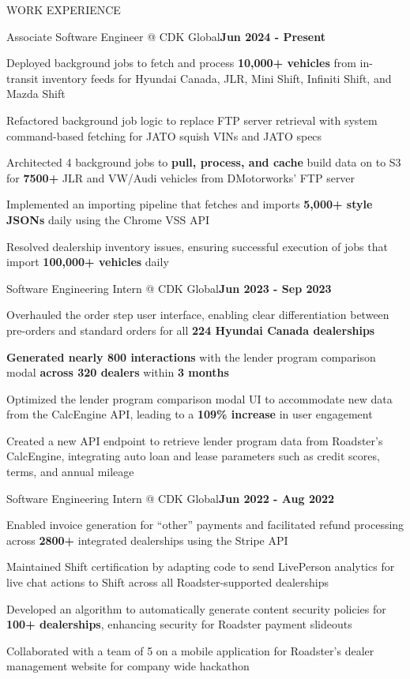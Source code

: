 \documentclass[]{resume}
\begin{document}
\begin{section}{WORK EXPERIENCE}
    \begin{subsection}{Associate Software Engineer @ CDK Global}{}{\textbf{Jun 2024 - Present}}{}
        \item Deployed background jobs to fetch and process \textbf{10,000+ vehicles} from in-transit inventory feeds for Hyundai Canada, JLR, Mini Shift, Infiniti Shift, and Mazda Shift
        \item Refactored background job logic to replace FTP server retrieval with system command-based fetching for JATO squish VINs and JATO specs
        \item Architected 4 background jobs to \textbf{pull, process, and cache} build data on to S3 for \textbf{7500+} JLR and VW/Audi vehicles from DMotorworks' FTP server
        \item Implemented an importing pipeline that fetches and imports \textbf{5,000+ style JSONs} daily using the Chrome VSS API
        \item Resolved dealership inventory issues, ensuring successful execution of jobs that import \textbf{100,000+ vehicles} daily
    \end{subsection}
    \begin{subsection}{Software Engineering Intern @ CDK Global}{}{\textbf{Jun 2023 - Sep 2023}}{}
        \item Overhauled the order step user interface, enabling clear differentiation between pre-orders and standard orders for all \textbf{224 Hyundai Canada dealerships}
        \item \textbf{Generated nearly 800 interactions} with the lender program comparison modal \textbf{across 320 dealers} within \textbf{3 months}
        \item Optimized the lender program comparison modal UI to accommodate new data from the CalcEngine API, leading to a \textbf{109\% increase} in user engagement
        \item Created a new API endpoint to retrieve lender program data from Roadster's CalcEngine, integrating auto loan and lease parameters such as credit scores, terms, and annual mileage
    \end{subsection}
    \begin{subsection}{Software Engineering Intern @ CDK Global}{}{\textbf{Jun 2022 - Aug 2022}}{}
        \item Enabled invoice generation for “other” payments and facilitated refund processing across \textbf{2800+} integrated dealerships using the Stripe API
        \item Maintained Shift certification by adapting code to send LivePerson analytics for live chat actions to Shift across all Roadster-supported dealerships
        \item Developed an algorithm to automatically generate content security policies for \textbf{100+ dealerships}, enhancing security for Roadster payment slideouts
        \item Collaborated with a team of 5 on a mobile application for Roadster’s dealer management website for company wide hackathon
    \end{subsection}
\end{section}
\end{document}
